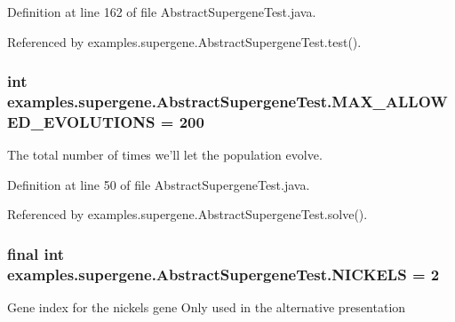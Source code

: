 Definition at line 162 of file Abstract\-Supergene\-Test.\-java.



Referenced by examples.\-supergene.\-Abstract\-Supergene\-Test.\-test().

\hypertarget{classexamples_1_1supergene_1_1_abstract_supergene_test_aabc7656a38ca4e7322c3ff08d34ee8f4}{
\subsubsection[{M\-A\-X\-\_\-\-A\-L\-L\-O\-W\-E\-D\-\_\-\-E\-V\-O\-L\-U\-T\-I\-O\-N\-S}]{\setlength{\rightskip}{0pt plus 5cm}int examples.\-supergene.\-Abstract\-Supergene\-Test.\-M\-A\-X\-\_\-\-A\-L\-L\-O\-W\-E\-D\-\_\-\-E\-V\-O\-L\-U\-T\-I\-O\-N\-S = 200\hspace{0.3cm}{\ttfamily [static]}}}\label{classexamples_1_1supergene_1_1_abstract_supergene_test_aabc7656a38ca4e7322c3ff08d34ee8f4}
The total number of times we'll let the population evolve. 

Definition at line 50 of file Abstract\-Supergene\-Test.\-java.



Referenced by examples.\-supergene.\-Abstract\-Supergene\-Test.\-solve().

\hypertarget{classexamples_1_1supergene_1_1_abstract_supergene_test_a816ceb1de4c9bf5c3df3bac9210c380c}{
\subsubsection[{N\-I\-C\-K\-E\-L\-S}]{\setlength{\rightskip}{0pt plus 5cm}final int examples.\-supergene.\-Abstract\-Supergene\-Test.\-N\-I\-C\-K\-E\-L\-S = 2\hspace{0.3cm}{\ttfamily [static]}}}\label{classexamples_1_1supergene_1_1_abstract_supergene_test_a816ceb1de4c9bf5c3df3bac9210c380c}
Gene index for the nickels gene Only used in the alternative presentation 


